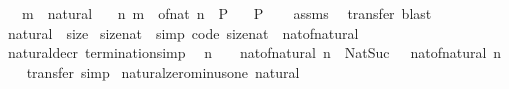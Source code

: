 \begin{isabellebody}
\ \ \ m\ {\isacharcolon}{\kern0pt}{\isacharcolon}{\kern0pt}\ natural\isanewline
\ \ \ {\isachardoublequoteopen}{\isasymAnd}n{\isachardot}{\kern0pt}\ m\ {\isacharequal}{\kern0pt}\ of{\isacharunderscore}{\kern0pt}nat\ n\ {\isasymLongrightarrow}\ P{\isachardoublequoteclose}\isanewline
\ \ \ P\isanewline
%
\isadelimproof
\ \ %
\endisadelimproof
%
\isatagproof
{}\isamarkupfalse%
\ assms\ \isamarkupfalse%
\ transfer\ blast%
\endisatagproof
{\isafoldproof}%
%
\isadelimproof
\isanewline
%
\endisadelimproof
\isanewline
{}\isamarkupfalse%
\ natural\ {\isacharcolon}{\kern0pt}{\isacharcolon}{\kern0pt}\ size\isanewline
{}\isanewline
\isanewline
{}\isamarkupfalse%
\ size{\isacharunderscore}{\kern0pt}nat\ \ {\isacharbrackleft}{\kern0pt}simp{\isacharcomma}{\kern0pt}\ code{\isacharbrackright}{\kern0pt}{\isacharcolon}{\kern0pt}\ {\isachardoublequoteopen}size{\isacharunderscore}{\kern0pt}nat\ {\isacharequal}{\kern0pt}\ nat{\isacharunderscore}{\kern0pt}of{\isacharunderscore}{\kern0pt}natural{\isachardoublequoteclose}\isanewline
\isanewline
{}\isamarkupfalse%
%
\isadelimproof
\ %
\endisadelimproof
%
\isatagproof
\isacommand{{\isachardot}{\kern0pt}{\isachardot}{\kern0pt}}\isamarkupfalse%
%
\endisatagproof
{\isafoldproof}%
%
\isadelimproof
%
\endisadelimproof
\isanewline
\isanewline
{}\isamarkupfalse%
\isanewline
\isanewline
{}\isamarkupfalse%
\ natural{\isacharunderscore}{\kern0pt}decr\ {\isacharbrackleft}{\kern0pt}termination{\isacharunderscore}{\kern0pt}simp{\isacharbrackright}{\kern0pt}{\isacharcolon}{\kern0pt}\isanewline
\ \ {\isachardoublequoteopen}n\ {\isasymnoteq}\ {}\ {\isasymLongrightarrow}\ nat{\isacharunderscore}{\kern0pt}of{\isacharunderscore}{\kern0pt}natural\ n\ {\isacharminus}{\kern0pt}\ Nat{\isachardot}{\kern0pt}Suc\ {}\ {\isacharless}{\kern0pt}\ nat{\isacharunderscore}{\kern0pt}of{\isacharunderscore}{\kern0pt}natural\ n{\isachardoublequoteclose}\isanewline
%
\isadelimproof
\ \ %
\endisadelimproof
%
\isatagproof
{}\isamarkupfalse%
\ transfer\ simp%
\endisatagproof
{\isafoldproof}%
%
\isadelimproof
\isanewline
%
\endisadelimproof
\isanewline
{}\isamarkupfalse%
\ natural{\isacharunderscore}{\kern0pt}zero{\isacharunderscore}{\kern0pt}minus{\isacharunderscore}{\kern0pt}one{\isacharcolon}{\kern0pt}\ {\isachardoublequoteopen}{\isacharparenleft}{\kern0pt}{}{\isacharcolon}{\kern0pt}{\isacharcolon}{\kern0pt}natural{\isacharparenright}{\kern0pt}\ {\isacharminus}{\kern0pt}\ {}\ {\isacharequal}{\kern0pt}\ {}{\isachardoublequoteclose}\isanewline

\end{isabellebody}
